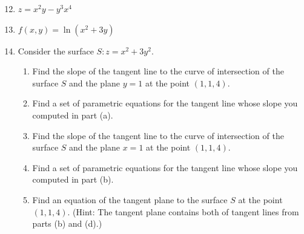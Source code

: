 \documentclass[12pt]{article}
\newif\ifans
\begin{document}
\begin{enumerate}
\setcounter{enumi}{11}

\item $z=x^2y-y^3x^4$ 

\ifans{\fbox{$\frac{\partial^2z}{\partial x^2}=2y-12x^2y^3$; $\frac{\partial^2z}{\partial y \partial x}=2x-12x^3y^2$; $\frac{\partial^2z}{\partial x \partial y}=2x-12x^3y^2$; $\frac{\partial^2z}{\partial y^2}=-6x^4y$}} \fi

\item $f(x,y)=\ln{(x^2+3y)}$ 

\ifans{\fbox{\parbox{0.6\linewidth}{$f_{xx}(x,y)=\frac{-2x^2+6y}{(x^2+3y)^2}$; $f_{xy}(x,y)=-\frac{6x}{(x^2+3y)^2}$;\\ $f_{yx}(x,y)=-\frac{6x}{(x^2+3y)^2}$; $f_{yy}(x,y)=-\frac{9}{(x^2+3y)^2}$}}} \fi

\item Consider the surface $S: z=x^2+3y^2$.  

\begin{enumerate}

\item Find the slope of the tangent line to the curve of intersection of the surface $S$ and the plane $y=1$ at the point $(1,1,4)$.

\ifans{\fbox{2}} \fi

\item Find a set of parametric equations for the tangent line whose slope you computed in part (a).  

\ifans{\fbox{\parbox{1\linewidth}{There are many possible parameterizations.  One possibility is $x=1+t$, $y=1$, $z=4+2t$.}}} \fi

\item Find the slope of the tangent line to the curve of intersection of the surface $S$ and the plane $x=1$ at the point $(1,1,4)$.

\ifans{\fbox{6}} \fi

\item Find a set of parametric equations for the tangent line whose slope you computed in part (b).  

\ifans{\fbox{\parbox{1\linewidth}{There are many possible parameterizations.  One possibility is $x=1$, $y=1+t$, $z=4+6t$.}}} \fi

\item Find an equation of the tangent plane to the surface $S$ at the point $(1,1,4)$. (Hint: The tangent plane contains both of tangent lines from parts (b) and (d).)


\end{enumerate}
\end{enumerate}
\end{document}
